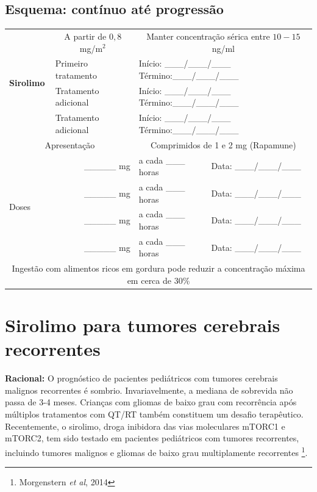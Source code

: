 \documentclass[11pt,a4paper,oldfontcommands]{memoir}
\begin{document}
\subsection{Esquema: contínuo até progressão}
\begin{center}
\begin{table}[H]
	\begin{tabular}{p{2.0cm}|p{4.0cm}|p{5.0cm}p{3.5cm}}
    \hline
		\multirow{4}{*}{\textbf{Sirolimo}}&\multicolumn{1}{c|}{A partir de \(0,8\) mg/m\(^2\)}&\multicolumn{2}{c}{Manter concentração sérica entre \(10-15\) ng/ml}\\
		{}&{Primeiro tratamento}&\multicolumn{2}{l}{Início: \_\_\_/\_\_\_/\_\_\_ Término:\_\_\_/\_\_\_/\_\_\_}\\
		{}&{Tratamento adicional}&\multicolumn{2}{l}{Início: \_\_\_/\_\_\_/\_\_\_ Término:\_\_\_/\_\_\_/\_\_\_}\\
		{}&{Tratamento adicional}&\multicolumn{2}{l}{Início: \_\_\_/\_\_\_/\_\_\_ Término:\_\_\_/\_\_\_/\_\_\_}\\
    \hline
		\multicolumn{2}{c|}{Apresentação}&\multicolumn{2}{c}{Comprimidos de 1 e 2 mg (Rapamune)}\\
    \hline
		\multirow{4}{*}{Doses}&\multicolumn{1}{r}{\_\_\_\_\_ mg}&{a cada \_\_\_ horas}&{Data: \_\_\_/\_\_\_/\_\_\_}\\
		{}&\multicolumn{1}{r}{\_\_\_\_\_ mg}&{a cada \_\_\_ horas}&{Data: \_\_\_/\_\_\_/\_\_\_}\\
		{}&\multicolumn{1}{r}{\_\_\_\_\_ mg}&{a cada \_\_\_ horas}&{Data: \_\_\_/\_\_\_/\_\_\_}\\
		{}&\multicolumn{1}{r}{\_\_\_\_\_ mg}&{a cada \_\_\_ horas}&{Data: \_\_\_/\_\_\_/\_\_\_}\\
    \hline
    \multicolumn{4}{c}{Ingestão com alimentos ricos em gordura  pode reduzir a concentração máxima em cerca de 30\%}\\
    \hline
\end{tabular}
\end{table}
\end{center}

\clearpage
\section{Sirolimo para tumores cerebrais recorrentes}
{\let\thefootnote\relax{}}

\textbf{Racional:} O prognóstico de pacientes pediátricos com tumores cerebrais malignos recorrentes é sombrio. Invariavelmente, a mediana de sobrevida não passa de 3-4 meses. Crianças com gliomas de baixo grau com recorrência após múltiplos tratamentos com QT/RT também constituem um desafio terapêutico. Recentemente, o sirolimo, droga inibidora das vias moleculares mTORC1 e mTORC2, tem sido testado em pacientes pediátricos com tumores recorrentes, incluindo tumores malignos e gliomas de baixo grau multiplamente recorrentes \footnote{Morgenstern \textit{et al}, 2014}.
\end{document}
